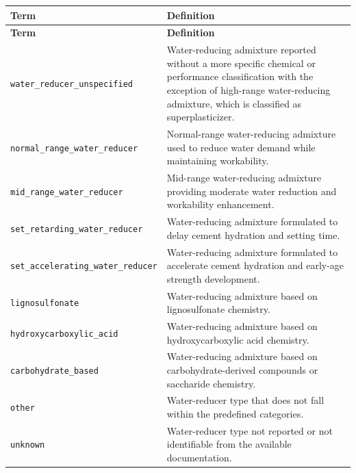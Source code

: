 \documentclass[11pt]{book}
\begin{document}
{\begin{longtable}{p{}p{}}
\hline
\textbf{Term} & \textbf{Definition} \\
\hline
\endfirsthead

\hline
\textbf{Term} & \textbf{Definition} \\
\hline
\endhead

\texttt{water\_reducer\_unspecified} &
Water-reducing admixture reported without a more specific chemical or performance classification with the exception of high-range water-reducing admixture, which is classified as superplasticizer.  \\

\texttt{normal\_range\_water\_reducer} &
Normal-range water-reducing admixture used to reduce water demand while maintaining workability. \\

\texttt{mid\_range\_water\_reducer} &
Mid-range water-reducing admixture providing moderate water reduction and workability enhancement. \\

\texttt{set\_retarding\_water\_reducer} &
Water-reducing admixture formulated to delay cement hydration and setting time. \\

\texttt{set\_accelerating\_water\_reducer} &
Water-reducing admixture formulated to accelerate cement hydration and early-age strength development. \\

\texttt{lignosulfonate} &
Water-reducing admixture based on lignosulfonate chemistry. \\

\texttt{hydroxycarboxylic\_acid} &
Water-reducing admixture based on hydroxycarboxylic acid chemistry. \\

\texttt{carbohydrate\_based} &
Water-reducing admixture based on carbohydrate-derived compounds or saccharide chemistry. \\

\texttt{other} &
Water-reducer type that does not fall within the predefined categories. \\

\texttt{unknown} &
Water-reducer type not reported or not identifiable from the available documentation. \\

\hline
\end{longtable}

}
\end{document}

